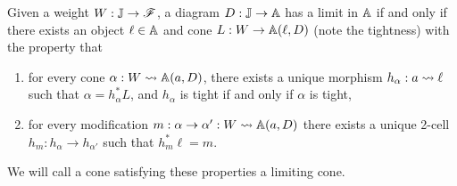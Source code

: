 \documentclass[../thesis.tex]{subfiles}
\begin{document}
  \begin{proposition}
    Given a weight $W : {\mathbb{J}} \to {\mathscr{F}}$, a diagram $D : {\mathbb{J}} \to {\mathbb{A}}$ has a limit in ${\mathbb{A}}$ if and only if there
    exists an object $\ell \in {\mathbb{A}}$ and cone $L : W \to {\mathbb{A}}(\ell,D)$ (note the tightness) with the property that
    \begin{enumerate}
      \item for every cone $\alpha : W \rightsquigarrow {\mathbb{A}}(a,D)$, there exists a unique morphism $h_\alpha : a \rightsquigarrow \ell$
        such that $\alpha = h_\alpha^*L$, and $h_\alpha$ is tight if and only if $\alpha$ is tight,
      \item for every modification $m : \alpha \to \alpha' : W \rightsquigarrow {\mathbb{A}}(a,D)$ there exists a unique 2-cell
        $h_m : h_\alpha \to h_{\alpha'}$ such that $h_m^*\ell = m$.
    \end{enumerate}
    We will call a cone satisfying these properties a limiting cone.
  \end{proposition}
\end{document}
